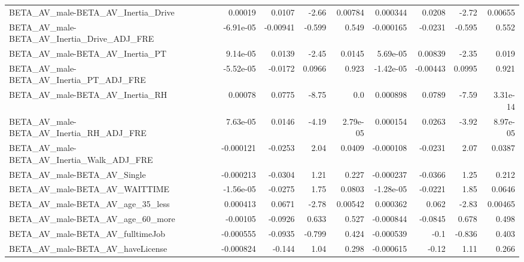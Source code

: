 \begin{tabular}{lrrrrrrrr}
BETA\_AV\_male-BETA\_AV\_Inertia\_Drive                 &     0.00019 &       0.0107 &    -2.66 &  0.00784 &   0.000344 &      0.0208 &        -2.72 &       0.00655 \\
BETA\_AV\_male-BETA\_AV\_Inertia\_Drive\_ADJ\_FRE         &   -6.91e-05 &     -0.00941 &   -0.599 &    0.549 &  -0.000165 &     -0.0231 &       -0.595 &         0.552 \\
BETA\_AV\_male-BETA\_AV\_Inertia\_PT                    &    9.14e-05 &       0.0139 &    -2.45 &   0.0145 &   5.69e-05 &     0.00839 &        -2.35 &         0.019 \\
BETA\_AV\_male-BETA\_AV\_Inertia\_PT\_ADJ\_FRE            &   -5.52e-05 &      -0.0172 &   0.0966 &    0.923 &  -1.42e-05 &    -0.00443 &       0.0995 &         0.921 \\
BETA\_AV\_male-BETA\_AV\_Inertia\_RH                    &     0.00078 &       0.0775 &    -8.75 &      0.0 &   0.000898 &      0.0789 &        -7.59 &      3.31e-14 \\
BETA\_AV\_male-BETA\_AV\_Inertia\_RH\_ADJ\_FRE            &    7.63e-05 &       0.0146 &    -4.19 & 2.79e-05 &   0.000154 &      0.0263 &        -3.92 &      8.97e-05 \\
BETA\_AV\_male-BETA\_AV\_Inertia\_Walk\_ADJ\_FRE          &   -0.000121 &      -0.0253 &     2.04 &   0.0409 &  -0.000108 &     -0.0231 &         2.07 &        0.0387 \\
BETA\_AV\_male-BETA\_AV\_Single                        &   -0.000213 &      -0.0304 &     1.21 &    0.227 &  -0.000237 &     -0.0366 &         1.25 &         0.212 \\
BETA\_AV\_male-BETA\_AV\_WAITTIME                      &   -1.56e-05 &      -0.0275 &     1.75 &   0.0803 &  -1.28e-05 &     -0.0221 &         1.85 &        0.0646 \\
BETA\_AV\_male-BETA\_AV\_age\_35\_less                   &    0.000413 &       0.0671 &    -2.78 &  0.00542 &   0.000362 &       0.062 &        -2.83 &       0.00465 \\
BETA\_AV\_male-BETA\_AV\_age\_60\_more                   &    -0.00105 &      -0.0926 &    0.633 &    0.527 &  -0.000844 &     -0.0845 &        0.678 &         0.498 \\
BETA\_AV\_male-BETA\_AV\_fulltimeJob                   &   -0.000555 &      -0.0935 &   -0.799 &    0.424 &  -0.000539 &        -0.1 &       -0.836 &         0.403 \\
BETA\_AV\_male-BETA\_AV\_haveLicense                   &   -0.000824 &       -0.144 &     1.04 &    0.298 &  -0.000615 &       -0.12 &         1.11 &         0.266 \\

\end{tabular}
